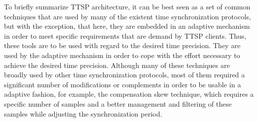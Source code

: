 To briefly summarize TTSP architecture, it can be best seen as a set of common techniques that are used by many of the existent time synchronization protocols, but with the exception, that here, they are embedded in an adaptive mechanism in order to meet specific requirements that are demand by TTSP clients. Thus, these tools are to be used with regard to the desired time precision. They are used by the adaptive mechanism in order to cope with the effort necessary to achieve the desired time precision. Although many of these techniques are broadly used by other time synchronization protocols, most of them required a significant number of modifications or complements in order to be usable in a adaptive fashion, for example, the compensation skew technique, which requires a specific number of samples and a better management and filtering of these samples while adjusting the synchronization period.\\
